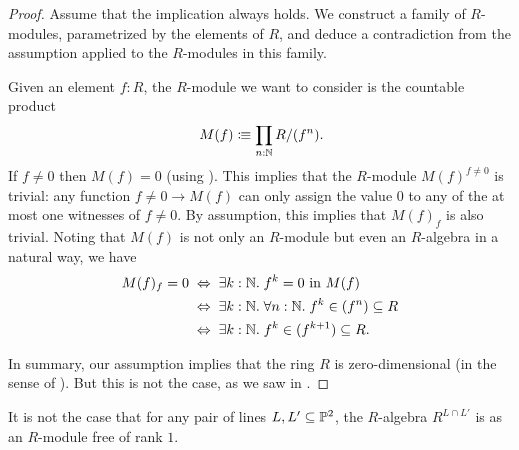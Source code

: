 \begin{proof}
  Assume that the implication always holds.
  We construct a family of $R$-modules,
  parametrized by the elements of $R$,
  and deduce a contradiction from the assumption
  applied to the $R$-modules in this family.

  Given an element $f : R$,
  the $R$-module we want to consider is
  the countable product
  \[ M(f) \colonequiv \prod_{n : \N} R/(f^n) \rlap{.} \]
  If $f \neq 0$ then $M(f) = 0$
  (using ).
  This implies that the $R$-module $M(f)^{f \neq 0}$
  is trivial:
  any function $f \neq 0 \to M(f)$ can only assign the value $0$
  to any of the at most one witnesses of $f \neq 0$.
  By assumption, this implies that $M(f)_f$ is also trivial.
  Noting that
  $M(f)$ is not only an $R$-module
  but even an $R$-algebra in a natural way,
  we have
  \begin{align*}
    M(f)_f = 0
    &\;\Leftrightarrow\;
    \exists k : \N.\; \text{$f^k = 0$ in $M(f)$} \\
    &\;\Leftrightarrow\;
    \exists k : \N.\; \forall n : \N.\; f^k \in (f^n) \subseteq R \\
    &\;\Leftrightarrow\;
    \exists k : \N.\; f^k \in (f^{k + 1}) \subseteq R
    \rlap{.}
  \end{align*}

  In summary,
  our assumption implies that the ring $R$ is zero-dimensional
  (in the sense of ).
  But this is not the case,
  as we saw in .
\end{proof}

\begin{example}
  It is not the case that
  for any pair of lines $L, L' \subseteq \mathbb{P}^2$,
  the $R$-algebra $R^{L \cap L'}$ is
  as an $R$-module free of rank $1$.
\end{example}

